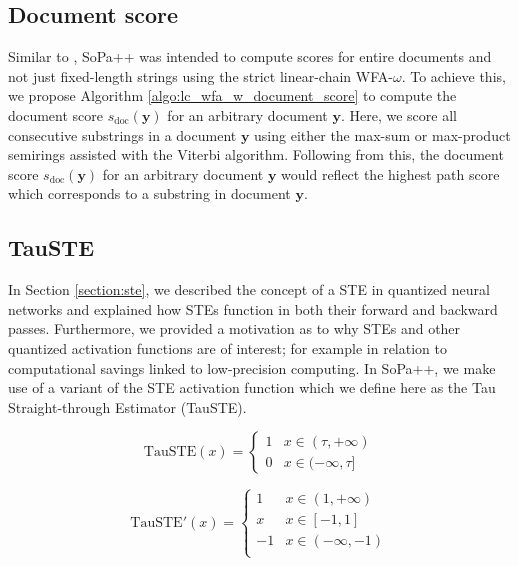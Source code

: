 \subsection{Document score}

Similar to \citet{schwartz2018sopa}, SoPa++ was intended to compute scores for
entire documents and not just fixed-length strings using the strict linear-chain
WFA-$\omega$. To achieve this, we propose Algorithm
\ref{algo:lc_wfa_w_document_score} to compute the document score
$s_{\text{doc}}(\bm{y})$ for an arbitrary document $\bm{y}$. Here, we score all
consecutive substrings in a document $\bm{y}$ using either the max-sum or
max-product semirings assisted with the Viterbi algorithm. Following from this,
the document score $s_{\text{doc}}(\bm{y})$ for an arbitrary document $\bm{y}$
would reflect the highest path score which corresponds to a substring in
document $\bm{y}$.

\subsection{TauSTE}

In Section \ref{section:ste}, we described the concept of a STE in quantized
neural networks and explained how STEs function in both their forward and
backward passes. Furthermore, we provided a motivation as to why STEs and other
quantized activation functions are of interest; for example in relation to
computational savings linked to low-precision computing. In SoPa++, we make use
of a variant of the STE activation function which we define here as the Tau
Straight-through Estimator (TauSTE).

\begin{equation}
  \label{eq:tau_ste_forward}
  \text{TauSTE}(x)=
  \begin{cases}
    1 & x \in (\tau, +\infty) \\
    0 & x \in (-\infty, \tau]
  \end{cases}
\end{equation}

\begin{equation}
  \label{eq:tau_ste_backward}
  \text{TauSTE}'(x)=
  \begin{cases}
    1 & x \in  (1, +\infty) \\
    x & x \in [-1, 1] \\
    -1 & x \in (-\infty, -1) \\
  \end{cases}
\end{equation}

